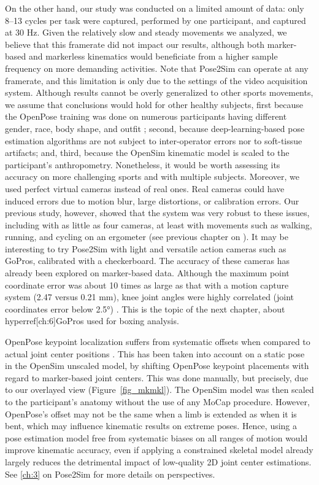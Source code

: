 On the other hand, our study was conducted on a limited amount of data: only 8–13 cycles per task were captured, performed by one participant, and captured at 30 Hz. Given the relatively slow and steady movements we analyzed, we believe that this framerate did not impact our results, although both marker-based and markerless kinematics would beneficiate from a higher sample frequency on more demanding activities. Note that Pose2Sim can operate at any framerate, and this limitation is only due to the settings of the video acquisition system. Although results cannot be overly generalized to other sports movements, we assume that conclusions would hold for other healthy subjects, first because the OpenPose training was done on numerous participants having different gender, race, body shape, and outfit \cite{Andriluka2014,Lin2014,Xiang2019}; second, because deep-learning-based pose estimation algorithms are not subject to inter-operator errors nor to soft-tissue artifacts; and, third, because the OpenSim kinematic model is scaled to the participant’s anthropometry. Nonetheless, it would be worth assessing its accuracy on more challenging sports and with multiple subjects. Moreover, we used perfect virtual cameras instead of real ones. Real cameras could have induced errors due to motion blur, large distortions, or calibration errors. Our previous study, however, showed that the system was very robust to these issues, including with as little as four cameras, at least with movements such as walking, running, and cycling on an ergometer (see previous chapter on  \cite{Pagnon2021}). It may be interesting to try Pose2Sim with light and versatile action cameras such as GoPros, calibrated with a checkerboard. The accuracy of these cameras has already been explored on marker-based data. Although the maximum point coordinate error was about 10 times as large as that with a motion capture system (2.47 versus 0.21 mm), knee joint angles were highly correlated (joint coordinates error below 2.5°) \cite{Dalla2019}. This is the topic of the next chapter, about hyperref[ch:6]{GoPros used for boxing analysis}.

OpenPose keypoint localization suffers from systematic offsets when compared to actual joint center positions \cite{Needham2021b}. This has been taken into account on a static pose in the OpenSim unscaled model, by shifting OpenPose keypoint placements with regard to marker-based joint centers. This was done manually, but precisely, due to our overlayed view (Figure~\ref{fig_mkmkl}). The OpenSim model was then scaled to the participant’s anatomy without the use of any MoCap procedure. However, OpenPose’s offset may not be the same when a limb is extended as when it is bent, which may influence kinematic results on extreme poses. Hence, using a pose estimation model free from systematic biases on all ranges of motion would improve kinematic accuracy, even if applying a constrained skeletal model already largely reduces the detrimental impact of low-quality 2D joint center estimations. See \autoref{ch:3} on Pose2Sim for more details on perspectives.

